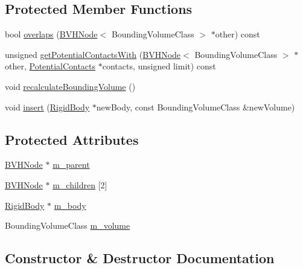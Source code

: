 \subsection*{Protected Member Functions}
\begin{DoxyCompactItemize}
\item 
bool \mbox{\hyperlink{classrum_1_1_b_v_h_node_aa176d1fba23945d06408826696d71e96}{overlaps}} (\mbox{\hyperlink{classrum_1_1_b_v_h_node}{B\+V\+H\+Node}}$<$ Bounding\+Volume\+Class $>$ $\ast$other) const
\item 
unsigned \mbox{\hyperlink{classrum_1_1_b_v_h_node_a2a840c54d0bbf56b62423a844b4e170d}{get\+Potential\+Contacts\+With}} (\mbox{\hyperlink{classrum_1_1_b_v_h_node}{B\+V\+H\+Node}}$<$ Bounding\+Volume\+Class $>$ $\ast$other, \mbox{\hyperlink{structrum_1_1_potential_contacts}{Potential\+Contacts}} $\ast$contacts, unsigned limit) const
\item 
void \mbox{\hyperlink{classrum_1_1_b_v_h_node_a6f75cbc2e93e2f333c4506e5532e95c6}{recalculate\+Bounding\+Volume}} ()
\item 
void \mbox{\hyperlink{classrum_1_1_b_v_h_node_a5dfec848630b5b123edcdf4bb4587f0e}{insert}} (\mbox{\hyperlink{classrum_1_1_rigid_body}{Rigid\+Body}} $\ast$new\+Body, const Bounding\+Volume\+Class \&new\+Volume)
\end{DoxyCompactItemize}
\subsection*{Protected Attributes}
\begin{DoxyCompactItemize}
\item 
\mbox{\hyperlink{classrum_1_1_b_v_h_node}{B\+V\+H\+Node}} $\ast$ \mbox{\hyperlink{classrum_1_1_b_v_h_node_ae69483db4fada9afde3a31393243a87d}{m\+\_\+parent}}
\item 
\mbox{\hyperlink{classrum_1_1_b_v_h_node}{B\+V\+H\+Node}} $\ast$ \mbox{\hyperlink{classrum_1_1_b_v_h_node_a681ca4a3084ba34bd54c546a7ef2a36c}{m\+\_\+children}} \mbox{[}2\mbox{]}
\item 
\mbox{\hyperlink{classrum_1_1_rigid_body}{Rigid\+Body}} $\ast$ \mbox{\hyperlink{classrum_1_1_b_v_h_node_a24954eb90f55a8a29c6459706554c9d6}{m\+\_\+body}}
\item 
Bounding\+Volume\+Class \mbox{\hyperlink{classrum_1_1_b_v_h_node_aae21162bff289e2d0d502c9360d0f36c}{m\+\_\+volume}}
\end{DoxyCompactItemize}


\subsection{Constructor \& Destructor Documentation}
\mbox{\label{classrum_1_1_b_v_h_node_aca2a55118d5c021f92b8e0105fa32625}} 
